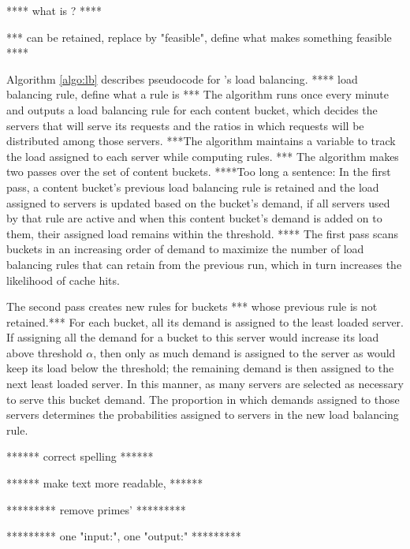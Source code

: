 
**** what is ? ****

*** can be retained, replace by "feasible", define what makes something feasible ****

Algorithm \ref{algo:lb} describes pseudocode for \shrink's load balancing. 
**** load balancing rule, define what a rule is  *** 
The algorithm runs once every minute and outputs a load balancing rule for each content bucket, which decides the servers that will serve its requests and the ratios in which requests will be distributed among those servers. 
***The algorithm maintains a variable to track the load assigned to each server while computing rules. *** 
The algorithm makes two passes over the set of content buckets. 
****Too long a sentence: In the first pass, a content bucket's previous load balancing rule is retained and the load assigned to servers is updated based on the bucket's demand, if all servers used by that rule are active and when this content bucket's demand is added on to them, their assigned load remains within the threshold. ****
The first pass scans buckets  in an increasing order of demand to maximize the number of load balancing rules that can retain from the previous run, which in turn increases the likelihood of cache hits. 

The second pass creates new rules for buckets *** whose previous rule is not retained.*** For each bucket, all its demand is assigned to the least loaded server. If assigning all the demand for a bucket to this server would increase its load above threshold $\alpha$, then only as much demand is assigned to the server as would keep its load below the threshold; the remaining demand is then assigned to the next least loaded server. In this manner, as many servers are selected as necessary to serve this bucket demand. The proportion in which demands assigned to those servers  determines the probabilities assigned to servers in the new load balancing rule.

****** correct spelling ******

****** make text more readable,  ******

********* remove primes' *********

********* one "input:", one "output:" *********

